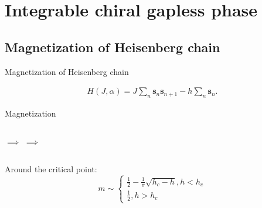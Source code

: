 \section{Integrable chiral gapless phase}
\subsection{Magnetization of Heisenberg chain}
\begin{frame}{Magnetization of Heisenberg chain}
\begin{block}{}
    \begin{equation*}
    \begin{aligned}
        H(J, \alpha) =
        J \sum_{n} \mathbf{s}_n \mathbf{s}_{n+1}
        - h \sum_{n} \mathbf{s}_n.
    \end{aligned}
    \end{equation*}
\end{block}

\begin{block}{Magnetization}
    \begin{columns}[t]
        \centering
        $\implies$
        \centering
        $\implies$
        \centering
    \end{columns}

Around the critical point:
\begin{equation*}
    m \sim
    \begin{cases}
        \frac12 - \frac{1}{\pi}\sqrt{h_c-h}, h<h_c \\
        \frac12, h>h_c
    \end{cases}
\end{equation*}
\end{block}

\end{frame}
